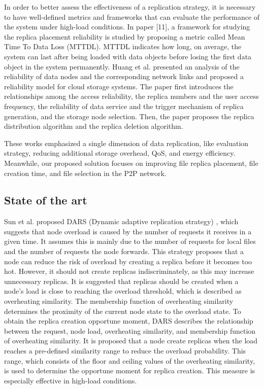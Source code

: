 \documentclass[10pt, conference]{IEEEtran}
\begin{document}
In order to better assess the effectiveness of a replication strategy, it is necessary to have \cite{chang_2008_a} well-defined metrics and frameworks that can evaluate the performance of the system under high-load conditions. In paper [11], a framework for studying the replica placement reliability is studied by proposing a metric called Mean Time To Data Loss (MTTDL). MTTDL indicates how long, on average, the system can last after being loaded with data objects before losing the first data object in the system permanently. Huang et al. \cite{huang2014modeling} presented an analysis of the reliability of data nodes and the corresponding network links and proposed a reliability model for cloud storage systems. The paper first introduces the relationships among the access reliability, the replica numbers and the user access frequency, the reliability of data service and the trigger mechanism of replica generation, and the storage node selection. Then, the paper proposes the replica distribution algorithm and the replica deletion algorithm.

These works emphasized a single dimension of data replication, like evaluation strategy, reducing additional storage overhead, QoS, and energy efficiency. Meanwhile, our proposed solution focuses on improving file replica placement, file creation time, and file selection in the P2P network.

\subsection{State of the art}
Sun et al. proposed DARS (Dynamic adaptive replication strategy) \cite{sun_2009_dynamic}, which suggests that node overload is caused by the number of requests it receives in a given time. It assumes this is mainly due to the number of requests for local files and the number of requests the node forwards. This strategy proposes that a node can reduce the risk of overload by creating a replica before it becomes too hot. However, it should not create replicas indiscriminately, as this may increase unnecessary replicas. It is suggested that replicas should be created when a node's load is close to reaching the overload threshold, which is described as overheating similarity. The membership function of overheating similarity determines the proximity of the current node state to the overload state. To obtain the replica creation opportune moment, DARS describes the relationship between the request, node load, overheating similarity, and membership function of overheating similarity. It is proposed that a node create replicas when the load reaches a pre-defined similarity range to reduce the overload probability. This range, which consists of the floor and ceiling values of the overheating similarity, is used to determine the opportune moment for replica creation. This measure is especially effective in high-load conditions.
\end{document}

